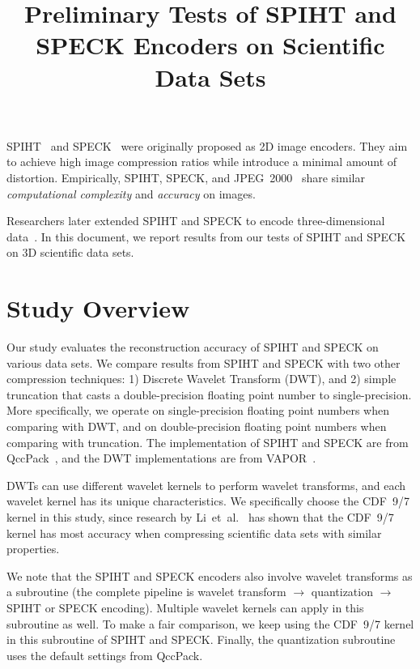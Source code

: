 \documentclass[review]{vgtc}                 %
\title{Preliminary Tests of SPIHT and SPECK Encoders on Scientific Data Sets}
\begin{document}

\maketitle

\label{sec:intro}
%
SPIHT~\cite{said1996new} and SPECK~\cite{pearlman2004efficient} 
were originally proposed as 2D image encoders.
%
They aim to achieve high image compression ratios while introduce 
a minimal amount of distortion.
%
Empirically, SPIHT, SPECK, and JPEG~2000~\cite{pearlman2004efficient}
share similar \textit{computational complexity} and \textit{accuracy}
on images.


Researchers later extended SPIHT and SPECK to encode three-dimensional
data~\cite{kim1997embedded, tang2006three}. 
%
In this document, we report results from our tests of 
SPIHT and SPECK on 3D scientific data sets.


\section{Study Overview}
%
Our study evaluates the reconstruction accuracy of SPIHT and SPECK
on various data sets. 
%
We compare results from SPIHT and SPECK with two other compression techniques:
1) Discrete Wavelet Transform (DWT), 
and 2) simple truncation that casts a double-precision
floating point number to single-precision.
%
More specifically, 
we operate on single-precision floating point numbers
when comparing with DWT, and on double-precision 
floating point numbers when comparing with truncation.
%
The implementation of SPIHT and SPECK are from QccPack~\cite{fowler2000qccpack},
and the DWT implementations are from VAPOR~\cite{clyne2007interactive}.


DWTs can use different wavelet kernels to perform wavelet transforms,
and each wavelet kernel has its unique characteristics.
%
We specifically choose the CDF~9/7 kernel in this study, since research by
Li~et~al.~\cite{li2015evaluating}
has shown that the CDF~9/7 kernel has most accuracy when compressing 
scientific data sets with similar properties.
%


We note that the SPIHT and SPECK encoders also involve wavelet transforms
as a subroutine (the complete pipeline is wavelet transform 
$\rightarrow$ quantization $\rightarrow$ SPIHT or SPECK encoding).
%
Multiple wavelet kernels can apply in this subroutine as well.
%
To make a fair comparison, we keep using the CDF~9/7 kernel in 
this subroutine of SPIHT and SPECK.
%
Finally, the quantization subroutine uses the default settings
from QccPack.
\end{document}
